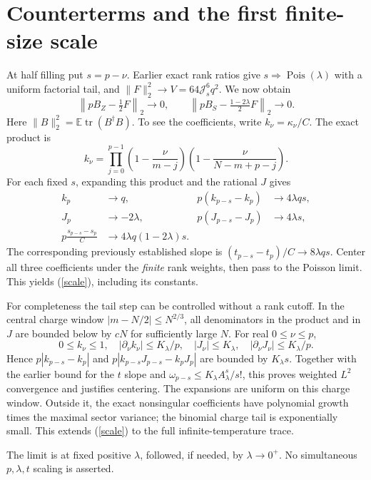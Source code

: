 \documentclass[11pt,a4paper]{article}
\newcommand{\Js}{\mathcal J_s}
\newcommand{\E}{\mathbb E}
\newcommand{\tr}{\operatorname{tr}}
\begin{document}
\newpage
\section{Counterterms and the first finite-size scale}
At half filling put $s=p-\nu$. Earlier exact rank ratios give
$s\Rightarrow\operatorname{Pois}(\lambda)$ with a uniform factorial
tail, and $\|F\|_2^2\to V=64\Js^6q^2$. We now obtain
\begin{equation}
 \boxed{\left\|pB_Z-\tfrac12F\right\|_2\to0,\qquad
 \left\|pB_S-\tfrac{1-2\lambda}{2}F\right\|_2\to0.}\label{scale}
\end{equation}
Here $\|B\|_2^2=\E\tr(B^\dagger B)$. To see the coefficients,
write $k_\nu=\kappa_\nu/C$. The exact product is
\[
 k_\nu=\prod_{j=0}^{p-1}
 \left(1-\frac{\nu}{m-j}\right)
 \left(1-\frac{\nu}{N-m+p-j}\right).
\]
For each fixed $s$, expanding this product and the rational $J$ gives
\begin{align}
 k_p&\to q,&p(k_{p-s}-k_p)&\to4\lambda qs,\\
 J_p&\to-2\lambda,&p(J_{p-s}-J_p)&\to4\lambda s,\\
 p\frac{s_{p-s}-s_p}{C}&\to4\lambda q(1-2\lambda)s.
\end{align}
The corresponding previously established slope is
$(t_{p-s}-t_p)/C\to8\lambda qs$. Center all three coefficients
under the \emph{finite} rank weights, then pass to the Poisson limit.
This yields (\ref{scale}), including its constants.

For completeness the tail step can be controlled without a rank
cutoff. In the central charge window $|m-N/2|\leq N^{2/3}$,
all denominators in the product and in $J$ are bounded below by
$cN$ for sufficiently large $N$. For real $0\leq\nu\leq p$,
\[
 0\leq k_\nu\leq1,\quad
 |\partial_\nu k_\nu|\leq K_\lambda/p,\quad
 |J_\nu|\leq K_\lambda,\quad
 |\partial_\nu J_\nu|\leq K_\lambda/p.
\]
Hence $p|k_{p-s}-k_p|$ and
$p|k_{p-s}J_{p-s}-k_pJ_p|$ are bounded by $K_\lambda s$.
Together with the earlier bound for the $t$ slope and
$\omega_{p-s}\leq K_\lambda A_\lambda^s/s!$, this proves
weighted $L^2$ convergence and justifies centering. The expansions
are uniform on this charge window. Outside it, the exact nonsingular
coefficients have polynomial growth times the maximal sector variance;
the binomial charge tail is exponentially small. This extends
(\ref{scale}) to the full infinite-temperature trace.

The limit is at fixed positive $\lambda$, followed, if needed, by
$\lambda\to0^+$. No simultaneous $p,\lambda,t$ scaling is asserted.
\end{document}
